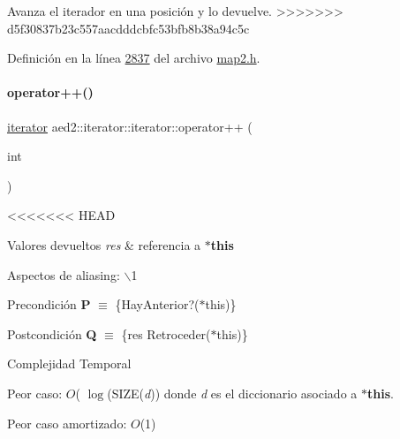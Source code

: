 Avanza el iterador en una posición y lo devuelve. 
>>>>>>> d5f30837b23c557aacdddcbfc53bfb8b38a94c5c

Definición en la línea \hyperlink{map2_8h_source_l02837}{2837} del archivo \hyperlink{map2_8h_source}{map2.\+h}.

\mbox{\label{classaed2_1_1iterator_1_1iterator_aa2023454f3ce45f7da4ef23d7a7f6749_aa2023454f3ce45f7da4ef23d7a7f6749}} 
\paragraph{\texorpdfstring{operator++()}{operator++()}\hspace{0.1cm}{\footnotesize\ttfamily [2/2]}}
{\footnotesize\ttfamily \hyperlink{classaed2_1_1iterator_1_1iterator}{iterator} aed2\+::iterator\+::iterator\+::operator++ (\begin{DoxyParamCaption}\item[{int}]{ }\end{DoxyParamCaption})\hspace{0.3cm}{\ttfamily [inline]}}


<<<<<<< HEAD
\begin{DoxyRetVals}{\-Valores devueltos}
{\em res} & referencia a {\bfseries $\ast$this}\\
\hline
\end{DoxyRetVals}
\begin{DoxyParagraph}{\-Aspectos de aliasing\-:}
$\backslash$1
\end{DoxyParagraph}
\begin{DoxyPrecond}{\-Precondición}
{\bfseries \-P} $\equiv$ \{\-Hay\-Anterior?($\ast$this)\} 
\end{DoxyPrecond}
\begin{DoxyPostcond}{\-Postcondición}
{\bfseries \-Q} $\equiv$ \{res  \-Retroceder($\ast$this)\}
\end{DoxyPostcond}

\begin{DoxyDescription}
\item[\-Complejidad \-Temporal]
\begin{DoxyItemize}
\item \-Peor caso\-: $O$( $\log$(\-S\-I\-Z\-E({\itshape d\/})) donde {\itshape d\/} es el diccionario asociado a {\bfseries $\ast$this}.
\item \-Peor caso amortizado\-: $O$(1) 
\end{DoxyItemize}
\end{DoxyDescription}


